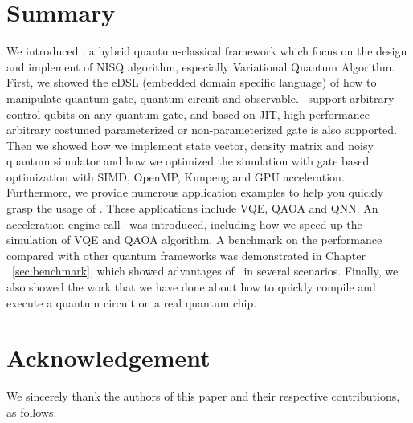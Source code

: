 \documentclass[pra,twocolumn,superscriptaddress,floatfix,nofootinbib,amsmath,amssymb]{revtex4-1}
\numberwithin{equation}{section}
\numberwithin{figure}{section}
\numberwithin{table}{section}
\begin{document}
\section{Summary}
\label{sec:summary}
We introduced \MindQuantum, a hybrid quantum-classical framework which focus on the design and implement of NISQ algorithm, especially Variational Quantum Algorithm. First, we showed the eDSL (embedded domain specific language) of how to manipulate quantum gate, quantum circuit and observable. \MindQuantum\ support arbitrary control qubits on any quantum gate, and based on JIT, high performance arbitrary costumed parameterized or non-parameterized gate is also supported. Then we showed how we implement state vector, density matrix and noisy quantum simulator and how we optimized the simulation with gate based optimization with SIMD, OpenMP, Kunpeng and GPU acceleration. Furthermore, we provide numerous application examples to help you quickly grasp the usage of \MindQuantum. These applications include VQE, QAOA and QNN. An acceleration engine call \QuPack\ was introduced, including how we speed up the simulation of VQE and QAOA algorithm. A benchmark on the performance compared with other quantum frameworks was demonstrated in Chapter ~\ref{sec:benchmark}, which showed advantages of \MindQuantum\ in several scenarios. Finally, we also showed the work that we have done about how to quickly compile and execute a quantum circuit on a real quantum chip.

\section{Acknowledgement}
\label{sec:acknowledgement}
We sincerely thank the authors of this paper and their respective contributions, as follows:
\end{document}
